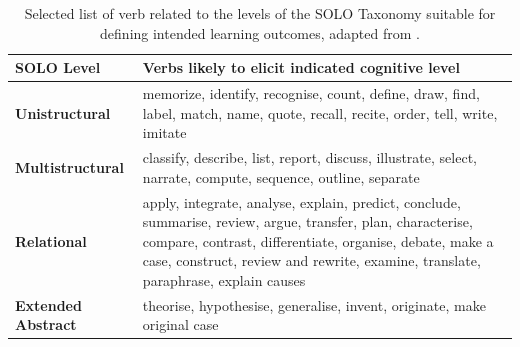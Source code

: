 \begin{table}[p]
	\renewcommand{\arraystretch}{1.6}
	\centering

	\caption{Selected list of verb related to the levels of the SOLO Taxonomy suitable for defining intended learning outcomes, adapted from \citet{Biggs:2007}.}
 	\label{tbl:solo_verbs}
 	\footnotesize
    \begin{tabular}{lp{10cm}}
    SOLO Level        & Verbs likely to elicit indicated cognitive level \\
    \hline
    \textbf{Unistructural}     & memorize, identify, recognise, count, define, draw, find, label, match, name, quote, recall, recite, order, tell, write, imitate\\
    \textbf{Multistructural}   & classify, describe, list, report, discuss, illustrate, select, narrate, compute, sequence, outline, separate\\
    \textbf{Relational}        & apply, integrate, analyse, explain, predict, conclude, summarise, review, argue, transfer, plan, characterise, compare, contrast, differentiate, organise, debate, make a case, construct, review and rewrite, examine, translate, paraphrase, explain causes \\
    \textbf{Extended Abstract} & theorise, hypothesise, generalise, invent, originate, make original case\\
    \end{tabular}
\end{table}

%
% 
%
%
%

